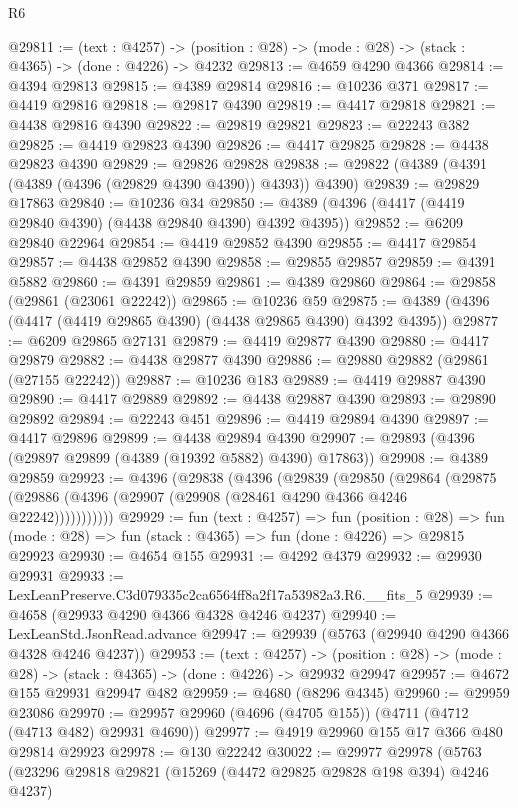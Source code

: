 \begin{lexlean}{R6}
\begin{coremodule}
@29811 := (text : @4257) ->
  (position : @28) -> (mode : @28) -> (stack : @4365) -> (done : @4226) -> @4232
@29813 := @4659 @4290 @4366
@29814 := @4394 @29813
@29815 := @4389 @29814
@29816 := @10236 @371
@29817 := @4419 @29816
@29818 := @29817 @4390
@29819 := @4417 @29818
@29821 := @4438 @29816 @4390
@29822 := @29819 @29821
@29823 := @22243 @382
@29825 := @4419 @29823 @4390
@29826 := @4417 @29825
@29828 := @4438 @29823 @4390
@29829 := @29826 @29828
@29838 := @29822 (@4389 (@4391 (@4389 (@4396 (@29829 @4390 @4390)) @4393)) @4390)
@29839 := @29829 @17863
@29840 := @10236 @34
@29850 := @4389 (@4396 (@4417 (@4419 @29840 @4390) (@4438 @29840 @4390) @4392 @4395))
@29852 := @6209 @29840 @22964
@29854 := @4419 @29852 @4390
@29855 := @4417 @29854
@29857 := @4438 @29852 @4390
@29858 := @29855 @29857
@29859 := @4391 @5882
@29860 := @4391 @29859
@29861 := @4389 @29860
@29864 := @29858 (@29861 (@23061 @22242))
@29865 := @10236 @59
@29875 := @4389 (@4396 (@4417 (@4419 @29865 @4390) (@4438 @29865 @4390) @4392 @4395))
@29877 := @6209 @29865 @27131
@29879 := @4419 @29877 @4390
@29880 := @4417 @29879
@29882 := @4438 @29877 @4390
@29886 := @29880 @29882 (@29861 (@27155 @22242))
@29887 := @10236 @183
@29889 := @4419 @29887 @4390
@29890 := @4417 @29889
@29892 := @4438 @29887 @4390
@29893 := @29890 @29892
@29894 := @22243 @451
@29896 := @4419 @29894 @4390
@29897 := @4417 @29896
@29899 := @4438 @29894 @4390
@29907 := @29893 (@4396 (@29897 @29899 (@4389 (@19392 @5882) @4390) @17863))
@29908 := @4389 @29859
@29923 := @4396
    (@29838
      (@4396
        (@29839
          (@29850
            (@29864
              (@29875 (@29886 (@4396 (@29907 (@29908 (@28461 @4290 @4366 @4246 @22242)))))))))))
@29929 := fun (text : @4257) =>
  fun (position : @28) =>
  fun (mode : @28) => fun (stack : @4365) => fun (done : @4226) => @29815 @29923
@29930 := @4654 @155
@29931 := @4292 @4379
@29932 := @29930 @29931
@29933 := LexLeanPreserve.C3d079335c2ca6564ff8a2f17a53982a3.R6.__fits_5
@29939 := @4658 (@29933 @4290 @4366 @4328 @4246 @4237)
@29940 := LexLeanStd.JsonRead.advance
@29947 := @29939 (@5763 (@29940 @4290 @4366 @4328 @4246 @4237))
@29953 := (text : @4257) ->
  (position : @28) -> (mode : @28) -> (stack : @4365) -> (done : @4226) -> @29932 @29947
@29957 := @4672 @155 @29931 @29947 @482
@29959 := @4680 (@8296 @4345)
@29960 := @29959 @23086
@29970 := @29957 @29960 (@4696 (@4705 @155)) (@4711 (@4712 (@4713 @482) @29931 @4690))
@29977 := @4919 @29960 @155 @17 @366 @480 @29814 @29923
@29978 := @130 @22242
@30022 := @29977
    @29978
    (@5763
      (@23296
        @29818
        @29821
        (@15269 (@4472 @29825 @29828 @198 @394) @4246 @4237)

\end{coremodule}
\end{lexlean}
